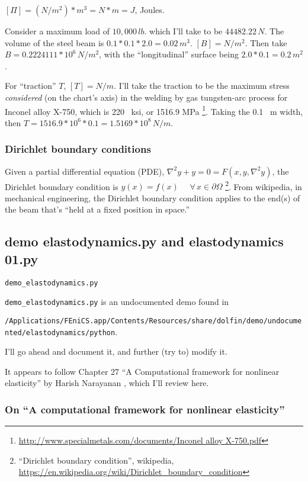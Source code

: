 \documentclass[twoside,landscape,10pt]{amsart}
\theoremstyle{plain}
\theoremstyle{definition}
\theoremstyle{remark}
\begin{document}
\begin{multicols*}{2}
$[\Pi] = (N/m^2) *m^3 = N*m = J$, Joules.  

Consider a maximum load of $10,000 \, lb.$ which I'll take to be $44482.22 \, N$.  The volume of the steel beam is $0.1*0.1*2.0 = 0.02 \, m^3$.  $[B] = N/m^2$.  Then take $B = 0.2224111*10^6 \, N/m^2$, with the ``longitudinal'' surface being $2.0*0.1 = 0.2 \, m^2$.    

For ``traction'' $T$, $[T]= N/m$.  I'll take the traction to be the maximum stress \emph{considered} (on the chart's axis) in the welding by gas tungsten-arc process for Inconel alloy X-750, which is 220 \, ksi, or 1516.9 MPa \footnote{\url{http://www.specialmetals.com/documents/Inconel alloy X-750.pdf}}.  Taking the 0.1 \, m width, then $T = 1516.9*10^6 * 0.1 = 1.5169 * 10^8 \, N/m$.   

\subsubsection{Dirichlet boundary conditions}

Given a partial differential equation (PDE), $\nabla^2 y + y = 0 = F(x,y,\nabla^2 y)$, the Dirichlet boundary condition is $y(x) = f(x)$ \, \, $\forall \, x \in \partial \Omega$ \footnote{``Dirichlet boundary condition'', wikipedia, \url{https://en.wikipedia.org/wiki/Dirichlet_boundary_condition}}.  From wikipedia, in mechanical engineering, the Dirichlet boundary condition applies to the end(s) of the beam that's ``held at a fixed position in space.''  


\subsection{demo elastodynamics.py and elastodynamics 01.py}

\verb|demo_elastodynamics.py|

\verb|demo_elastodynamics.py| is an undocumented demo found in 

\verb|/Applications/FEniCS.app/Contents/Resources/share/dolfin/demo/undocumented/elastodynamics/python|.  

I'll go ahead and document it, and further (try to) modify it.

It appears to follow Chapter 27 ``A Computational framework for nonlinear elasticity'' by Harish Narayanan \cite{FEniCS}, which I'll review here.

\subsubsection{On ``A computational framework for nonlinear elasticity''}


\end{multicols*}
\end{document}
